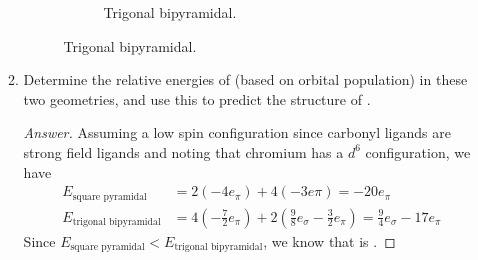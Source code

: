 \documentclass[../psets.tex]{subfiles}
\begin{document}
\begin{enumerate}[label={\Roman*)}]
\begin{enumerate}
\begin{figure}[h!]
\begin{subfigure}[b]{0.3\linewidth}
                \caption{Trigonal bipyramidal.}
            \end{subfigure}
        \end{figure}
        \item Determine the relative energies of  (based on orbital population) in these two geometries, and use this to predict the structure of .
        \begin{proof}[Answer]
            Assuming a low spin configuration since carbonyl ligands are strong field ligands and noting that chromium has a $d^6$ configuration, we have
            \begin{align*}
                E_\text{square pyramidal} &= 2(-4e_\pi)+4(-3e\pi) = -20e_\pi\\
                E_\text{trigonal bipyramidal} &= 4\left( -\frac{7}{2}e_\pi \right)+2\left( \frac{9}{8}e_\sigma-\frac{3}{2}e_\pi \right) = \frac{9}{4}e_\sigma-17e_\pi
            \end{align*}
            Since $E_\text{square pyramidal}<E_\text{trigonal bipyramidal}$, we know that  is .
        \end{proof}
    \end{enumerate}
\end{enumerate}
\end{document}
